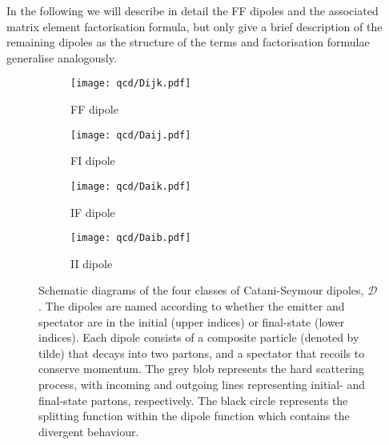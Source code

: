 \documentclass[main.tex]{subfiles}
\begin{document}
    In the following we will describe in detail the FF dipoles
    and the associated matrix element factorisation formula,
    but only give a brief description of the remaining dipoles as
    the structure of the terms and factorisation formulae
    generalise analogously.

    \begin{figure}
        \centering
        \begin{subfigure}{0.49\linewidth}
            \texttt{[image: qcd/Dijk.pdf]}
            \caption{FF dipole}
            \vspace{20pt}
        \end{subfigure}
        \begin{subfigure}{0.49\linewidth}
            \texttt{[image: qcd/Daij.pdf]}
            \caption{FI dipole}
            \vspace{20pt}
        \end{subfigure}
        \begin{subfigure}{0.49\linewidth}
            \texttt{[image: qcd/Daik.pdf]}
            \caption{IF dipole}
        \end{subfigure}
        \begin{subfigure}{0.49\linewidth}
            \texttt{[image: qcd/Daib.pdf]}
            \caption{II dipole}
        \end{subfigure}
        \vspace{30pt}
        \caption{Schematic diagrams of the four classes of Catani-Seymour
            dipoles, $\mathcal{D}$. The dipoles are named according to
            whether the emitter and spectator are in the initial (upper indices) or final-state (lower indices).
            Each dipole consists of a composite particle (denoted by tilde)
            that decays into two partons, and a spectator that recoils
            to conserve momentum. The grey blob represents the hard scattering process,
            with incoming and outgoing lines representing initial- and final-state
            partons, respectively. The black circle represents the splitting
            function within the dipole function which contains the divergent
            behaviour.}
        \label{fig:CS_dipoles}
    \end{figure}
\end{document}
